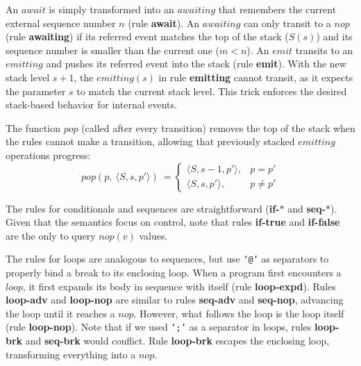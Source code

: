 \documentclass{acm_proc_article-sp}
\newcommand{\CEU}{\textsc{C\'{e}u}\xspace}
\newcommand{\code}[1] {{\small{\texttt{#1}}}}
\newcommand{\LL}{\langle}
\newcommand{\RR}{\rangle}
\newcommand{\rr}[1] {{\textbf{\scriptsize{#1}}}}
\newcommand{\1}{\;}
\newcommand{\2}{\;\;}
\newcommand{\3}{\;\;\;}
\newcommand{\5}{\;\;\;\;\;}
\begin{document}
An $await$ is simply transformed into an $awaiting$ that remembers the current 
external sequence number $n$ (rule \rr{await}).
An $awaiting$ can only transit to a $nop$ (rule \rr{awaiting}) if its referred 
event matches the top of the stack ($S(s)$) and its sequence number is smaller 
than the current one ($m<n$).
%
%
An $emit$ transits to an $emitting$ and pushes its referred event into the 
stack (rule \rr{emit}).
With the new stack level $s+1$, the $emitting(s)$ in rule \rr{emitting} cannot 
transit, as it expects the parameter $s$ to match the current stack level.
This trick enforces the desired stack-based behavior for internal events.

The function $pop$ (called after every transition) removes the top of the stack 
when the rules cannot make a transition, allowing that previously stacked 
$emitting$ operations progress:
%
\[
pop(p,~\LL S, s, p' \RR)~=
\begin{cases}
    \LL S, s-1, p' \RR, & p = p' \\
    \LL S, s,   p' \RR, & p \neq p'
\end{cases}
\]
%
\begin{comment}
The first two cases query the $awaiting$ and $emitting$ operations to check if 
they are blocked.
Note that the test predicates are reversed in comparison to the semantic rules 
\rr{awaiting} and \rr{emitting} (i.e. they test when \emph{not} to advance).
Note also that $nop$ is not considered a blocked operation.

An emitted event remains at the top of the stack while there are matching 
$awaiting$ operations---only after the $isBlocked$ predicate becomes true that 
the $pop$ function takes effect.
This behavior provides the desired broadcast communication for events.
\end{comment}

The rules for conditionals and sequences are straightforward (\rr{if-$*$} and 
\rr{seq-$*$}).
%
Given that the semantics focus on control, note that rules \rr{if-true} and 
\rr{if-false} are the only to query $nop(v)$ values.

The rules for loops are analogous to sequences, but use \code{`@'} as 
separators to properly bind a break to its enclosing loop.
%
When a program first encounters a $loop$, it first expands its body in sequence 
with itself (rule \rr{loop-expd}).
Rules \rr{loop-adv} and \rr{loop-nop} are similar to rules \rr{seq-adv} and 
\rr{seq-nop}, advancing the loop until it reaches a $nop$.
However, what follows the loop is the loop itself (rule \rr{loop-nop}).
Note that if we used \code{`;'} as a separator in loops, rules \rr{loop-brk} 
and \rr{seq-brk} would conflict.
%
Rule \rr{loop-brk} escapes the enclosing loop, transforming everything into a 
$nop$.
\end{document}
